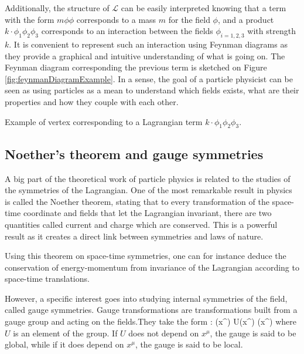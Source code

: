     Additionally, the structure of $\mathcal{L}$ can be easily interpreted knowing that
    a term with the form $m \phi \phi$ corresponds to a mass $m$ for the field $\phi$,
    and a product $k \cdot \phi_1 \phi_2 \phi_3$ corresponds to an interaction
    between the fields $\phi_{i=1,2,3}$ with strength $k$. It is convenient to
    represent such an interaction using Feynman diagrams as they provide a graphical and
    intuitive understanding of what is going on. The Feynman diagram corresponding the
    previous term is sketched on Figure \ref{fig:feynmanDiagramExample}. In a sense, the
    goal of a particle physicist can be seen as using particles as a mean to understand
    which fields exists, what are their properties and how they couple with each other.

                 {Example of vertex corresponding to a Lagrangian term
                 $k \cdot \phi_1 \phi_2 \phi_3$.}

        \subsection{Noether's theorem and gauge symmetries}

    A big part of the theoretical work of particle physics is related to the studies of
    the symmetries of the Lagrangian. One of the most remarkable result in physics is
    called the Noether theorem, stating that to every transformation of the space-time
    coordinate and fields that let the Lagrangian invariant, there are two quantities
    called current and charge which are conserved. This is a powerful result as it creates
    a direct link between symmetries and laws of nature.

    Using this theorem on space-time symmetries, one can for instance deduce the
    conservation of energy-momentum from invariance of the Lagrangian according to
    space-time translations.

    However, a specific interest goes into studying internal symmetries of the field,
    called gauge symmetries. Gauge transformations are transformations built from a gauge
    group and acting on the fields.They take the form :
    {
        \psi(x^\mu)
        \rightarrow
        U(x^\mu) \psi(x^\mu)
    }
    where $U$ is an element of the group. If $U$ does not depend on $x^\mu$, the gauge is
    said to be global, while if it does depend on $x^\mu$, the gauge is said to be local.

